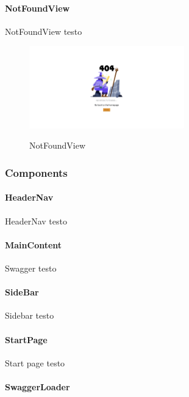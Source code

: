 \paragraph{NotFoundView}\label{par:not-found-view}
NotFoundView testo

\begin{figure}[ht]
  \centering
  \includegraphics[width=0.6\textwidth, alt={Pagina di errore 404}]{images/frontend/NotFoundView.jpg}
  \caption{NotFoundView}\label{fig:not-found-view}
\end{figure}

\subsubsection{Components}\label{subsubsec:components}

\paragraph{HeaderNav}\label{par:header-nav}

HeaderNav testo

\paragraph{MainContent}\label{par:main-content}
Swagger testo

\paragraph{SideBar}\label{par:side-bar}

Sidebar testo

\paragraph{StartPage}\label{par:start-page}

Start page testo

\paragraph{SwaggerLoader}\label{par:swagger-loader}


